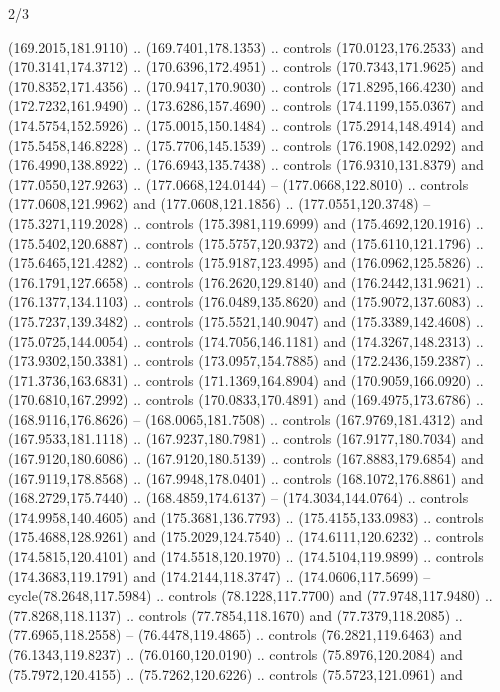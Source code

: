 \begin{flagdescription}{2/3}
\begin{scope}[shift={(0.5\flaglength,0.5)},scale=\flagwidth/320]
\begin{scope}[y=0.8pt, x=0.8pt, yscale=-1,shift={(-118.3,-146)}]
  (169.2015,181.9110) .. (169.7401,178.1353) .. controls (170.0123,176.2533) and
  (170.3141,174.3712) .. (170.6396,172.4951) .. controls (170.7343,171.9625) and
  (170.8352,171.4356) .. (170.9417,170.9030) .. controls (171.8295,166.4230) and
  (172.7232,161.9490) .. (173.6286,157.4690) .. controls (174.1199,155.0367) and
  (174.5754,152.5926) .. (175.0015,150.1484) .. controls (175.2914,148.4914) and
  (175.5458,146.8228) .. (175.7706,145.1539) .. controls (176.1908,142.0292) and
  (176.4990,138.8922) .. (176.6943,135.7438) .. controls (176.9310,131.8379) and
  (177.0550,127.9263) .. (177.0668,124.0144) -- (177.0668,122.8010) .. controls
  (177.0608,121.9962) and (177.0608,121.1856) .. (177.0551,120.3748) --
  (175.3271,119.2028) .. controls (175.3981,119.6999) and (175.4692,120.1916) ..
  (175.5402,120.6887) .. controls (175.5757,120.9372) and (175.6110,121.1796) ..
  (175.6465,121.4282) .. controls (175.9187,123.4995) and (176.0962,125.5826) ..
  (176.1791,127.6658) .. controls (176.2620,129.8140) and (176.2442,131.9621) ..
  (176.1377,134.1103) .. controls (176.0489,135.8620) and (175.9072,137.6083) ..
  (175.7237,139.3482) .. controls (175.5521,140.9047) and (175.3389,142.4608) ..
  (175.0725,144.0054) .. controls (174.7056,146.1181) and (174.3267,148.2313) ..
  (173.9302,150.3381) .. controls (173.0957,154.7885) and (172.2436,159.2387) ..
  (171.3736,163.6831) .. controls (171.1369,164.8904) and (170.9059,166.0920) ..
  (170.6810,167.2992) .. controls (170.0833,170.4891) and (169.4975,173.6786) ..
  (168.9116,176.8626) -- (168.0065,181.7508) .. controls (167.9769,181.4312) and
  (167.9533,181.1118) .. (167.9237,180.7981) .. controls (167.9177,180.7034) and
  (167.9120,180.6086) .. (167.9120,180.5139) .. controls (167.8883,179.6854) and
  (167.9119,178.8568) .. (167.9948,178.0401) .. controls (168.1072,176.8861) and
  (168.2729,175.7440) .. (168.4859,174.6137) -- (174.3034,144.0764) .. controls
  (174.9958,140.4605) and (175.3681,136.7793) .. (175.4155,133.0983) .. controls
  (175.4688,128.9261) and (175.2029,124.7540) .. (174.6111,120.6232) .. controls
  (174.5815,120.4101) and (174.5518,120.1970) .. (174.5104,119.9899) .. controls
  (174.3683,119.1791) and (174.2144,118.3747) .. (174.0606,117.5699) --
  cycle(78.2648,117.5984) .. controls (78.1228,117.7700) and (77.9748,117.9480)
  .. (77.8268,118.1137) .. controls (77.7854,118.1670) and (77.7379,118.2085) ..
  (77.6965,118.2558) -- (76.4478,119.4865) .. controls (76.2821,119.6463) and
  (76.1343,119.8237) .. (76.0160,120.0190) .. controls (75.8976,120.2084) and
  (75.7972,120.4155) .. (75.7262,120.6226) .. controls (75.5723,121.0961) and

\end{scope}
\end{scope}
\end{flagdescription}
